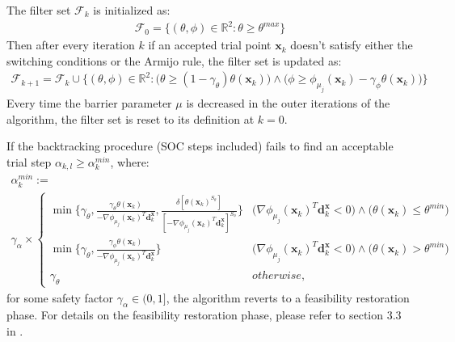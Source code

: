  The filter set $\mathcal{F}_k$ is initialized as:
  \begin{align}
      \mathcal{F}_0 = \{ (\theta, \phi) \in \mathbb{R}^2 : \theta \geq \theta^{max} \}
  \end{align}
  Then after every iteration $k$ if an accepted trial point $\bm{x}_k$ doesn't satisfy either the switching conditions or the Armijo rule, the filter set is updated as:
  \begin{align}
      \mathcal{F}_{k+1} = \mathcal{F}_k \cup \Bigg\{ (\theta, \phi) \in \mathbb{R}^2 : \Big( \theta \geq (1 - \gamma_{\theta}) \theta(\bm{x}_k) \Big) \wedge \Big( \phi \geq \phi_{\mu_j}(\bm{x}_k) - \gamma_{\phi} \theta(\bm{x}_k) \Big) \Bigg\}
  \end{align}
  Every time the barrier parameter $\mu$ is decreased in the outer iterations of the algorithm, the filter set is reset to its definition at $k = 0$.
  
  If the backtracking procedure (SOC steps included) fails to find an acceptable trial step $\alpha_{k,l} \geq \alpha_k^{min}$, where:
  \begin{multline}
    \alpha_k^{min} := \\
    \gamma_{\alpha} \times \begin{cases}
      \min \Bigg\{ \gamma_{\theta}, \frac{\gamma_{\theta} \theta(\bm{x}_k)}{-\nabla \phi_{\mu_j}(\bm{x}_k)^T \bm{d}_k^{\bm{x}}}, \frac{\delta [\theta(\bm{x}_k)^{S_{\theta}}]}{[-\nabla \phi_{\mu_j}(\bm{x}_k)^T \bm{d}_k^{\bm{x}}]^{S_{\phi}}}  \Bigg\} & \Big( \nabla \phi_{\mu_j}(\bm{x}_k)^T \bm{d}_k^{\bm{x}} < 0 \Big) \wedge \Big( \theta(\bm{x}_k) \leq \theta^{min} \Big) \\
      \min \Bigg\{ \gamma_{\theta}, \frac{\gamma_{\phi} \theta(\bm{x}_k)}{-\nabla \phi_{\mu_j}(\bm{x}_k)^T \bm{d}_k^{\bm{x}}} \Bigg\} & \Big( \nabla \phi_{\mu_j}(\bm{x}_k)^T \bm{d}_k^{\bm{x}} < 0 \Big) \wedge \Big( \theta(\bm{x}_k) > \theta^{min} \Big) \\
      \gamma_{\theta} & otherwise,
    \end{cases}
  \end{multline}
  for some safety factor $\gamma_{\alpha} \in (0, 1]$, the algorithm reverts to a feasibility restoration phase. For details on the feasibility restoration phase, please refer to section 3.3 in \cite{Wachter2006}.
  
